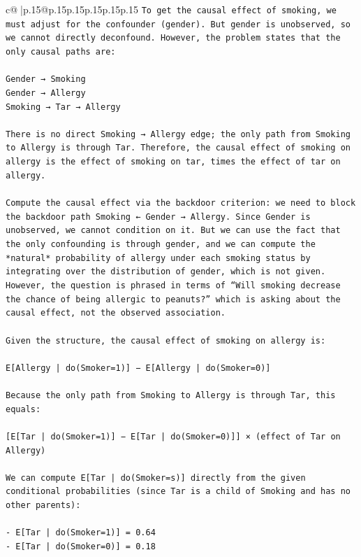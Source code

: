 \documentclass{article}
\begin{document}
{\begin{supertabular}{c@{$\;$}|p{.15\linewidth}@{}p{.15\linewidth}p{.15\linewidth}p{.15\linewidth}p{.15\linewidth}p{.15\linewidth}}
{{{\texttt{To get the causal effect of smoking, we must adjust for the confounder (gender). But gender is unobserved, so we cannot directly deconfound. However, the problem states that the only causal paths are:} \\
\\ 
\texttt{Gender → Smoking  } \\
\texttt{Gender → Allergy  } \\
\texttt{Smoking → Tar → Allergy  } \\
\\ 
\texttt{There is no direct Smoking → Allergy edge; the only path from Smoking to Allergy is through Tar. Therefore, the causal effect of smoking on allergy is the effect of smoking on tar, times the effect of tar on allergy.} \\
\\ 
\texttt{Compute the causal effect via the backdoor criterion: we need to block the backdoor path Smoking ← Gender → Allergy. Since Gender is unobserved, we cannot condition on it. But we can use the fact that the only confounding is through gender, and we can compute the *natural* probability of allergy under each smoking status by integrating over the distribution of gender, which is not given. However, the question is phrased in terms of “Will smoking decrease the chance of being allergic to peanuts?” which is asking about the causal effect, not the observed association.} \\
\\ 
\texttt{Given the structure, the causal effect of smoking on allergy is:} \\
\\ 
\texttt{E{[}Allergy | do(Smoker=1){]} − E{[}Allergy | do(Smoker=0){]}} \\
\\ 
\texttt{Because the only path from Smoking to Allergy is through Tar, this equals:} \\
\\ 
\texttt{{[}E{[}Tar | do(Smoker=1){]} − E{[}Tar | do(Smoker=0){]}{]} × (effect of Tar on Allergy)} \\
\\ 
\texttt{We can compute E{[}Tar | do(Smoker=s){]} directly from the given conditional probabilities (since Tar is a child of Smoking and has no other parents):} \\
\\ 
\texttt{{-} E{[}Tar | do(Smoker=1){]} = 0.64  } \\
\texttt{{-} E{[}Tar | do(Smoker=0){]} = 0.18  } \\
}}}
\end{supertabular}}
\end{document}
